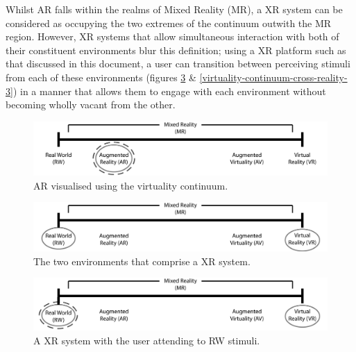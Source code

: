 \documentclass[oneside]{book}
\begin{document}
Whilst AR falls within the realms of Mixed Reality (MR), a XR system can be considered as occupying the two extremes of the continuum outwith the MR region. However, XR systems that allow simultaneous interaction with both of their constituent environments blur this definition; using a XR platform such as that discussed in this document, a user can transition between perceiving stimuli from each of these environments (figures \ref{virtuality-continuum-cross-reality-2} \& \ref{virtuality-continuum-cross-reality-3}) in a manner that allows them to engage with each environment without becoming wholly vacant from the other.

\begin{figure}[h]
	\begin{center}
		\includegraphics[width=\textwidth]{images/virtuality-continuum-augmented-reality.png}
		\caption{AR visualised using the virtuality continuum.}
		\label{virtuality-continuum-augmented-reality}
	\end{center}
\end{figure}

\begin{figure}[h]
	\begin{center}
		\includegraphics[width=\textwidth]{images/virtuality-continuum-cross-reality-1.png}
		\caption{The two environments that comprise a XR system.}
		\label{virtuality-continuum-cross-reality-1}
	\end{center}
\end{figure}

\begin{figure}[h]
	\begin{center}
		\includegraphics[width=\textwidth]{images/virtuality-continuum-cross-reality-2.png}
		\caption{A XR system with the user attending to RW stimuli.}
		\label{virtuality-continuum-cross-reality-2}
	\end{center}
\end{figure}
\end{document}
